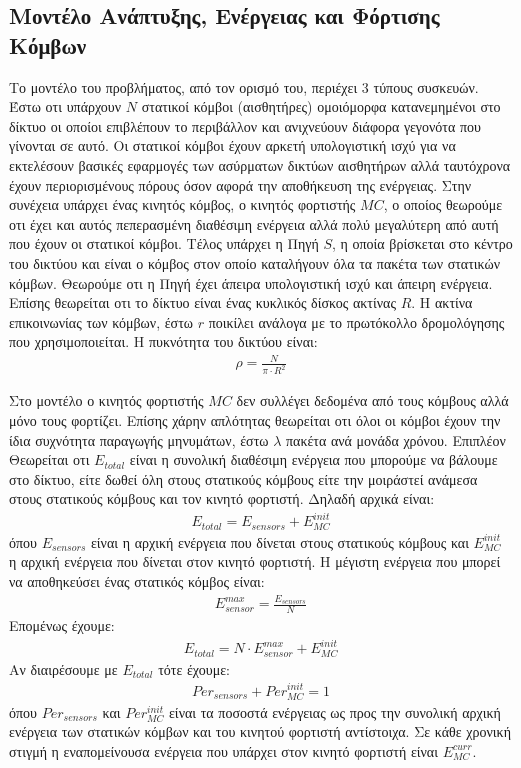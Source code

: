 \subsection{Μοντέλο Ανάπτυξης, Ενέργειας και Φόρτισης Κόμβων}
Το μοντέλο του προβλήματος, από τον ορισμό του, περιέχει 3 τύπους συσκευών. Έστω οτι υπάρχουν $N$ στατικοί κόμβοι (αισθητήρες) ομοιόμορφα κατανεμημένοι στο δίκτυο οι
οποίοι επιβλέπουν το περιβάλλον και ανιχνεύουν διάφορα γεγονότα που γίνονται σε αυτό. Οι στατικοί κόμβοι έχουν αρκετή υπολογιστική ισχύ για να εκτελέσουν βασικές
εφαρμογές των ασύρματων δικτύων αισθητήρων αλλά ταυτόχρονα έχουν περιορισμένους πόρους όσον αφορά την αποθήκευση της ενέργειας. Στην συνέχεια υπάρχει ένας κινητός
κόμβος, ο κινητός φορτιστής $MC$, ο οποίος θεωρούμε οτι έχει και αυτός πεπερασμένη διαθέσιμη ενέργεια αλλά πολύ μεγαλύτερη από αυτή που έχουν οι στατικοί κόμβοι.
Τέλος υπάρχει η Πηγή $S$, η οποία βρίσκεται στο κέντρο του δικτύου και είναι ο κόμβος στον οποίο καταλήγουν όλα τα πακέτα των στατικών κόμβων. Θεωρούμε οτι η Πηγή
έχει άπειρα υπολογιστική ισχύ και άπειρη ενέργεια. Επίσης θεωρείται οτι το δίκτυο είναι ένας κυκλικός δίσκος ακτίνας $R$. Η ακτίνα επικοινωνίας των κόμβων, έστω $r$
ποικίλει ανάλογα με το πρωτόκολλο δρομολόγησης που χρησιμοποιείται. Η πυκνότητα του δικτύου είναι:
\begin{align*}
\rho = \frac{N}{\pi\cdot R^{2}}
\end{align*}

Στο μοντέλο ο κινητός φορτιστής $MC$ δεν συλλέγει δεδομένα από τους κόμβους αλλά μόνο τους φορτίζει. Επίσης χάρην απλότητας θεωρείται οτι όλοι οι
κόμβοι έχουν την ίδια συχνότητα παραγωγής μηνυμάτων, έστω $\lambda$ πακέτα ανά μονάδα χρόνου. Επιπλέον Θεωρείται οτι $E_{total}$ είναι η συνολική διαθέσιμη ενέργεια
που μπορούμε να βάλουμε στο δίκτυο, είτε δωθεί όλη στους στατικούς κόμβους είτε την μοιράστεί ανάμεσα στους στατικούς κόμβους και τον κινητό φορτιστή. Δηλαδή
αρχικά είναι:
\begin{align}
\label{total}
E_{total} = E_{sensors} + E_{MC}^{init}
\end{align}
όπου $E_{sensors}$ είναι η αρχική ενέργεια που δίνεται στους στατικούς κόμβους και $E_{MC}^{init}$ η αρχική ενέργεια που δίνεται στον κινητό φορτιστή. Η μέγιστη
ενέργεια που μπορεί να αποθηκεύσει ένας στατικός κόμβος είναι:
\begin{align*}
E^{max}_{sensor} = \frac{E_{sensors}}{N}
\end{align*}
Επομένως έχουμε:
\begin{align*}
E_{total} = N \cdot E^{max}_{sensor} + E_{MC}^{init}
\end{align*}
 Αν διαιρέσουμε με $E_{total}$ τότε έχουμε:
\begin{align*}
Per_{sensors} + Per_{MC}^{init} = 1
\end{align*}
όπου $Per_{sensors}$ και $Per_{MC}^{init}$ είναι τα ποσοστά ενέργειας ως προς την συνολική αρχική ενέργεια των στατικών κόμβων και του κινητού φορτιστή αντίστοιχα.
Σε κάθε χρονική στιγμή η εναπομείνουσα ενέργεια που υπάρχει στον κινητό φορτιστή είναι $E^{curr}_{MC}$.

